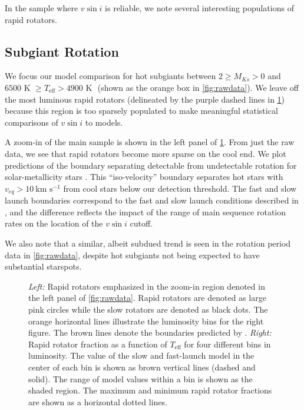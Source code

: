 \documentclass[preprint2]{aastex62}
\newcommand{\vsini}{\ensuremath{v \sin i}}
\newcommand{\Teff}{\ensuremath{T_{\textrm{eff}}}}
\newcommand{\kms}{\textrm{km~s}\ensuremath{^{-1}}}
\newcommand{\Ks}{\ensuremath{Ks}}
\newcommand{\MK}{\ensuremath{M_{\Ks}}}
\begin{document}
In the sample where \vsini{} is reliable, we note several interesting 
populations of rapid rotators. 

\subsection{Subgiant Rotation}
\label{sec:subgiants}

We focus our model comparison for hot subgiants between \(2 \ge \MK > 0\) and \(6500 \textrm{ K } 
\ge \Teff{} > 4900 \textrm{ K }\) (shown as the orange box in
\cref{fig:rawdata}). We leave off the most luminous rapid rotators (delineated by the purple dashed lines in \cref{fig:rrbins}) because this region is too sparsely populated to make meaningful statistical comparisons of \vsini{} to models.

A zoom-in of the main sample is shown in the left panel of
\cref{fig:rrbins}. From just the raw data, we see that rapid rotators become
more sparse on the cool end. We plot predictions of the boundary separating detectable from
undetectable rotation for solar-metallicity stars \citep{vanSaders13}.
This ``iso-velocity'' boundary separates hot stars with \(v_{eq} > 10~\kms\) from 
cool stars below
our detection threshold. The fast and slow launch boundaries correspond to the 
fast and slow launch conditions described in \citet{vanSaders13}, and the
difference reflects the impact of the range of main sequence rotation rates on
the location of the \vsini{} cutoff.

We also note that a similar, albeit subdued trend is seen in 
the rotation period data in \cref{fig:rawdata}, despite 
hot subgiants not being expected to have substantial starspots. 

\begin{figure}[htb]
    \centering
    \caption{\emph{Left: } Rapid rotators emphasized in the zoom-in region
        denoted in the left panel of \cref{fig:rawdata}. Rapid rotators are
        denoted as large pink circles while the slow rotators are denoted as
        black dots. The orange horizontal lines illustrate the luminosity bins 
        for the right figure. The brown lines denote the boundaries predicted
        by \citet{vanSaders13}. \emph{Right:}  
        Rapid rotator fraction as a function of \Teff{} for four different
    bins in luminosity. The value of the slow and fast-launch model in the
center of each bin is shown as brown vertical lines (dashed and solid). The
range of model values within a bin is shown as the shaded region. The maximum
and minimum rapid rotator fractions are shown as a horizontal dotted lines.}
    \label{fig:rrbins}
\end{figure}
\end{document}
